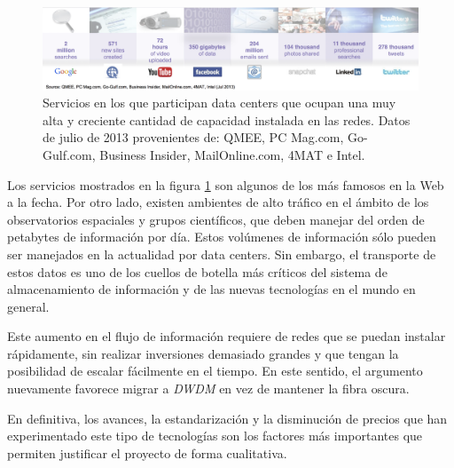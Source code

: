 \begin{figure}[H]
  \centering
  \includegraphics[width=15cm]{Imagenes/servicios.png}
  \caption{Servicios en los que participan data centers que ocupan una
    muy alta y creciente cantidad de capacidad instalada en las
    redes. Datos de julio de 2013 provenientes de: QMEE, PC Mag.com,
    Go-Gulf.com, Business Insider, MailOnline.com, 4MAT e Intel.}
  \label{fig:servicios}
\end{figure}

Los servicios mostrados en la figura \ref{fig:servicios} son algunos
de los más famosos en la Web a la fecha. Por otro lado, existen 
ambientes de alto tráfico en el ámbito de los observatorios espaciales
y grupos científicos, que deben manejar del orden de petabytes de
información por día. Estos volúmenes de información sólo pueden ser
manejados en la actualidad por data centers. Sin embargo, el
transporte de estos datos es uno de los cuellos de botella más
críticos del sistema de almacenamiento de información y de las nuevas
tecnologías en el mundo en general.

Este aumento en el flujo de información requiere de redes que se puedan
instalar rápidamente, sin realizar inversiones demasiado grandes y que
tengan la posibilidad de escalar fácilmente en el tiempo. En este
sentido, el argumento nuevamente favorece migrar a \emph{DWDM} en vez
de mantener la fibra oscura. 

En definitiva, los avances, la estandarización y la disminución de
precios que han experimentado este tipo de tecnologías son los
factores más importantes que permiten justificar el proyecto de forma
cualitativa.
